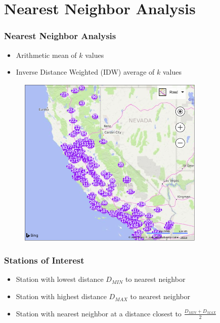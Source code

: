 \section{Nearest Neighbor Analysis}
\begin{frame}
\frametitle{Nearest Neighbor Analysis}
\begin{itemize}
\setlength\itemsep{1em}
\item Arithmetic mean of $k$ values
\item Inverse Distance Weighted (IDW) average of $k$ values
\end{itemize}
\end{frame}

\begin{frame}
\begin{figure}
\includegraphics[width=0.8\textwidth]{images/cimis-station-location}
\end{figure}
\end{frame}

\begin{frame}
\frametitle{Stations of Interest}
\begin{itemize}
	\setlength\itemsep{1em}
	\item Station with lowest distance $D_{MIN}$ to nearest neighbor
	\item Station with highest distance $D_{MAX}$ to nearest neighbor
	\item Station with nearest neighbor at a distance closest to $\frac{D_{MIN}+D_{MAX}}{2}$
\end{itemize}
\end{frame}

